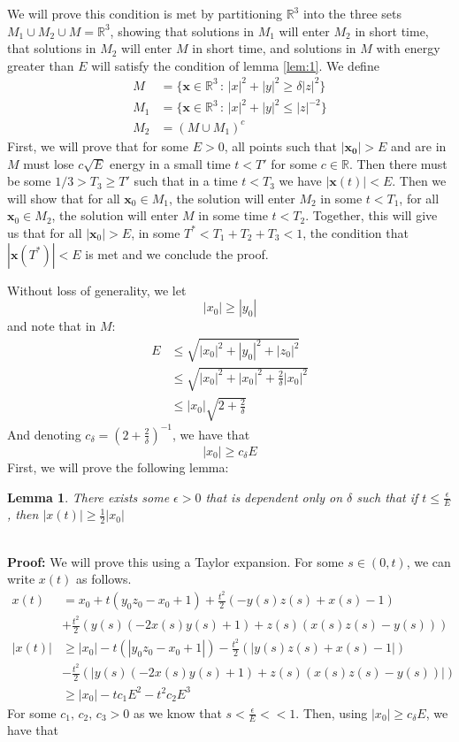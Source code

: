 \documentclass[11pt]{article}
\newtheorem{lemma}{Lemma}
\newcommand{\R}{\mathbb{R}}
\begin{document}
We will prove this condition is met by partitioning $\R^3$ into the three sets $M_1 \cup M_2 \cup M = \R^3$, showing that solutions in $M_1$ will enter $M_2$ in short time, that solutions in $M_2$ will enter $M$ in short time, and solutions in $M$ with energy greater than $E$ will satisfy the condition of lemma \ref{lem:1}. We define
\begin{align*}
    M &= \{ \mathbf{x} \in \R^3 \, : \, |x|^2 + |y|^2 \geq \delta |z|^2 \}\\
    M_1 &= \{ \mathbf{x} \in \R^3 \, : \, |x|^2 + |y|^2 \leq |z|^{-2} \}\\
    M_2 &= (M \cup M_1)^c
\end{align*}
First, we will prove that for some $E>0$, all points such that $|\mathbf{x_0}| > E$ and are in $M$ must lose $c\sqrt{ E}$ energy in a small time $t < T'$ for some $c\in \R$. Then there must be some $1/3> T_3 \geq T'$ such that in a time $t < T_3$ we have $|\mathbf{x}(t)| < E$. Then we will show that for all $\mathbf{x}_0 \in M_1$, the solution will enter $M_2$ in some $t < T_1$, for all $\mathbf{x}_0 \in M_2$, the solution will enter $M$ in some time $t < T_2$. Together, this will give us that for all $|\mathbf{x}_0| > E$, in some $T^* < T_1 + T_2 + T_3 < 1$, the condition that $|\mathbf{x}(T^*)| < E$ is met and we conclude the proof.

Without loss of generality, we let $$|x_0| \geq |y_0|$$and note that in $M$:
\begin{align*}
    E &\leq \sqrt{|x_0|^2 + |y_0|^2 + |z_0|^2}\\
    & \leq \sqrt{|x_0|^2 + |x_0|^2 + \frac{2}{\delta}|x_0|^2}\\
    & \leq |x_0|\sqrt{2 + \frac{2}{\delta}}
\end{align*}
 And denoting $c_{\delta} = (2 + \frac{2}{\delta})^{-1}$, we have that $$|x_0| \geq c_{\delta}E$$First, we will prove the following lemma:
 \begin{lemma}
     There exists some $\epsilon > 0$ that is dependent only on $\delta$ such that if $t \leq \frac{\epsilon}{E}$, then $|x(t)| \geq \frac{1}{2}|x_0|$
 \end{lemma}\\

 \textbf{Proof:} We will prove this using a Taylor expansion. For some $s \in (0, t)$, we can write $x(t)$ as follows. 
 \begin{align*}
     x(t)&= x_0 + t(y_0z_0 - x_0 + 1) + \frac{t^2}{2}(-y(s)z(s) + x(s) - 1)\\
     &+ \frac{t^2}{2}(y(s)(-2x(s)y(s)+1) + z(s)(x(s)z(s)-y(s)))\\
     |x(t)| &\geq |x_0| - t(|y_0z_0 - x_0 + 1|) - \frac{t^2}{2}(|y(s)z(s) + x(s) - 1|)\\
     &- \frac{t^2}{2}(|y(s)(-2x(s)y(s)+1) + z(s)(x(s)z(s)-y(s))|)\\
     & \geq |x_0| - tc_1E^2 - t^2c_2E^3
 \end{align*}
 For some $c_1, \, c_2, \, c_3> 0$ as we know that $s < \frac{\epsilon}{E} << 1$. Then, using $|x_0| \geq c_{\delta}E$, we have that 
\end{document}
